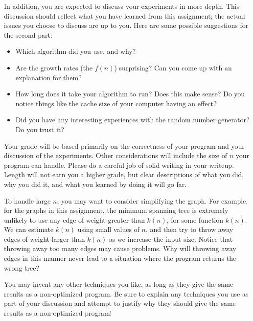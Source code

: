 \documentclass[11pt]{article}
\begin{document}
In addition, you are expected to discuss your experiments in more
depth.  This discussion should reflect what you have learned from
this assignment;  the actual issues you choose to discuss are up to
you.  Here are some possible suggestions for the second part:
\begin{itemize}
\item Which algorithm did you use, and why?
\item Are the growth rates (the $f(n)$) surprising?  Can you
come up with an explanation for them?
\item How long does it take your algorithm to run?  Does this make
sense?  Do you notice things like the cache size of your computer
having an effect?
\item Did you have any interesting experiences with the random
number generator?  Do you trust it?
\end{itemize}

Your grade will be based primarily on the correctness of your program
and your discussion of the experiments.  Other considerations will
include the size of $n$ your program can handle.  Please do a careful
job of solid writing in your writeup.  Length will not earn you a
higher grade, but clear descriptions of what you did, why you did it,
and what you learned by doing it will go far.  


To handle large $n$, you may want to consider simplifying the
graph.  For example, for the graphs in this assignment, the minimum
spanning tree is extremely unlikely to use any edge of weight greater
than $k(n)$, for some function $k(n)$.  We can estimate $k(n)$ using
small values of $n$, and then try to throw away edges of weight larger
than $k(n)$ as we increase the input size.  Notice that throwing away
too many edges may cause problems.  Why will throwing away edges in
this manner never lead to a situation where the program returns
the wrong tree?

You may invent any other techniques you like, as long as they give the
same results as a non-optimized program.  Be sure to explain any
techniques you use as part of your discussion and attempt to justify
why they should give the same results as a non-optimized program!
\end{document}
